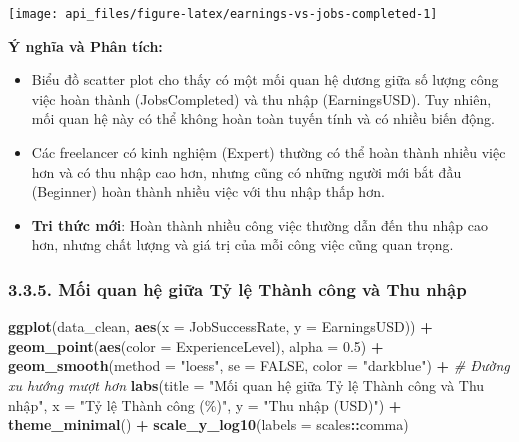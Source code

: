\documentclass[
]{article}
\newenvironment{Shaded}{\begin{snugshade}}{\end{snugshade}}
\newcommand{\AttributeTok}[1]{\textcolor[rgb]{0.13,0.29,0.53}{#1}}
\newcommand{\CommentTok}[1]{\textcolor[rgb]{0.56,0.35,0.01}{\textit{#1}}}
\newcommand{\ConstantTok}[1]{\textcolor[rgb]{0.56,0.35,0.01}{#1}}
\newcommand{\FloatTok}[1]{\textcolor[rgb]{0.00,0.00,0.81}{#1}}
\newcommand{\FunctionTok}[1]{\textcolor[rgb]{0.13,0.29,0.53}{\textbf{#1}}}
\newcommand{\NormalTok}[1]{#1}
\newcommand{\SpecialCharTok}[1]{\textcolor[rgb]{0.81,0.36,0.00}{\textbf{#1}}}
\newcommand{\StringTok}[1]{\textcolor[rgb]{0.31,0.60,0.02}{#1}}
\begin{document}
\begin{center}\texttt{[image: api\_files/figure-latex/earnings-vs-jobs-completed-1]} \end{center}

\textbf{Ý nghĩa và Phân tích:}

\begin{itemize}
\item
  Biểu đồ scatter plot cho thấy có một mối quan hệ dương giữa số lượng
  công việc hoàn thành (JobsCompleted) và thu nhập (EarningsUSD). Tuy
  nhiên, mối quan hệ này có thể không hoàn toàn tuyến tính và có nhiều
  biến động.
\item
  Các freelancer có kinh nghiệm (Expert) thường có thể hoàn thành nhiều
  việc hơn và có thu nhập cao hơn, nhưng cũng có những người mới bắt đầu
  (Beginner) hoàn thành nhiều việc với thu nhập thấp hơn.
\item
  \textbf{Tri thức mới}: Hoàn thành nhiều công việc thường dẫn đến thu
  nhập cao hơn, nhưng chất lượng và giá trị của mỗi công việc cũng quan
  trọng.
\end{itemize}

\subsubsection{3.3.5. Mối quan hệ giữa Tỷ lệ Thành công và Thu
nhập}\label{mux1ed1i-quan-hux1ec7-giux1eefa-tux1ef7-lux1ec7-thuxe0nh-cuxf4ng-vuxe0-thu-nhux1eadp}

\begin{Shaded}
\begin{Highlighting}[]
\FunctionTok{ggplot}\NormalTok{(data\_clean, }\FunctionTok{aes}\NormalTok{(}\AttributeTok{x =}\NormalTok{ JobSuccessRate, }\AttributeTok{y =}\NormalTok{ EarningsUSD)) }\SpecialCharTok{+}
  \FunctionTok{geom\_point}\NormalTok{(}\FunctionTok{aes}\NormalTok{(}\AttributeTok{color =}\NormalTok{ ExperienceLevel), }\AttributeTok{alpha =} \FloatTok{0.5}\NormalTok{) }\SpecialCharTok{+}
  \FunctionTok{geom\_smooth}\NormalTok{(}\AttributeTok{method =} \StringTok{"loess"}\NormalTok{, }\AttributeTok{se =} \ConstantTok{FALSE}\NormalTok{, }\AttributeTok{color =} \StringTok{"darkblue"}\NormalTok{) }\SpecialCharTok{+} \CommentTok{\# Đường xu hướng mượt hơn}
  \FunctionTok{labs}\NormalTok{(}\AttributeTok{title =} \StringTok{"Mối quan hệ giữa Tỷ lệ Thành công và Thu nhập"}\NormalTok{,}
       \AttributeTok{x =} \StringTok{"Tỷ lệ Thành công (\%)"}\NormalTok{,}
       \AttributeTok{y =} \StringTok{"Thu nhập (USD)"}\NormalTok{) }\SpecialCharTok{+}
  \FunctionTok{theme\_minimal}\NormalTok{() }\SpecialCharTok{+}
  \FunctionTok{scale\_y\_log10}\NormalTok{(}\AttributeTok{labels =}\NormalTok{ scales}\SpecialCharTok{::}\NormalTok{comma)}
\end{Highlighting}
\end{Shaded}
\end{document}
